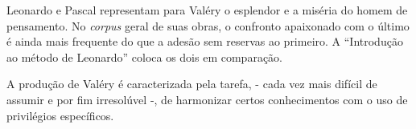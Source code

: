 Leonardo e Pascal representam para Valéry o esplendor e a miséria do
homem de pensamento. No \emph{corpus} geral de suas obras, o confronto
apaixonado com o último é ainda mais frequente do que a adesão sem
reservas ao primeiro. A ``Introdução ao método de Leonardo'' coloca os
dois em comparação.

A produção de Valéry é caracterizada pela tarefa, - cada vez mais
difícil de assumir e por fim irresolúvel -, de harmonizar certos
conhecimentos com o uso de privilégios específicos.
